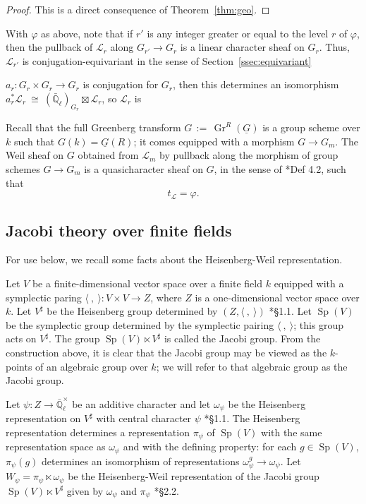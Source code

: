 \documentclass[10pt]{amsart}
\theoremstyle{plain}
\theoremstyle{definition}
\newcommand{\EE}{\mathbb{\bar Q}_\ell}
\newcommand{\Fq}{k}
\newcommand{\EEx}{\EE^\times}
\DeclareMathOperator{\Gr}{Gr}
\newcommand{\ceq}{{\, :=\, }}
\newcommand{\iso}{{\ \cong\ }}
\newcommand{\trFrob}[1]{t_{#1}}
\newcommand{\cs}[1]{{\mathcal{#1}}}
\newcommand{\Sp}{{\operatorname{Sp}}}
\begin{document}
\begin{proof}
This is a direct consequence of Theorem~\ref{thm:geo}.
\end{proof}

With $\varphi$ as above, note that if $r'$ is any integer greater or equal to the level $r$ of $\varphi$, then the pullback of $\cs{L}_r$ along $G_{r'} \to G_{r}$ is a linear character sheaf on $G_r$. 
Thus, $\cs{L}_{r'}$ is conjugation-equivariant in the sense of Section~\ref{ssec:equivariant}


$a_r : G_r\times G_r \to G_r$ is conjugation for $G_r$, then this determines an isomorphism $a_r^*\cs{L}_r \iso (\EE)_{G_r}\boxtimes \cs{L}_r$, so $\cs{L}_r$ is 


Recall that the full Greenberg transform $G \ceq \Gr^{R}(\underline{G})$ is a group scheme over $\Fq$ such that $G(\Fq) = \underline{G}(R)$; it comes equipped with a morphism $G \to G_m$.
The Weil sheaf on $G$ obtained from $\cs{L}_m$ by pullback along the morphism of group schemes $G \to G_m$ is a quasicharacter sheaf on $G$, in the sense of \cite{cunningham-roe:13a}*{Def 4.2}, such that 
\[
\trFrob{\cs{L}} = \varphi.
\]



\subsection{Jacobi theory over finite fields}\label{ssec:Jacobi}

For use below, we recall some facts about the Heisenberg-Weil representation.

Let $V$ be a finite-dimensional vector space over a finite field $\Fq$ equipped with a symplectic paring $\langle\ ,\ \rangle : V\times V \to Z$, where $Z$ is a one-dimensional vector space over $\Fq$.
Let $V^\sharp$ be the Heisenberg group determined by $(Z, \langle\ ,\ \rangle)$ \cite{gurevich-hadani:07a}*{\S 1.1}.
Let $\Sp(V)$ be the symplectic group determined by the symplectic pairing $\langle\ ,\ \rangle$; this group acts on $V^\sharp$.
The group $\Sp(V)\ltimes V^\sharp$ is called the Jacobi group. 
From the construction above, it is clear that the Jacobi group may be viewed as the $\Fq$-points of an algebraic group over $\Fq$; we will refer to that algebraic group as the Jacobi group.

Let $\psi : Z \to \EEx$ be an additive character and let $\omega_\psi$ be the Heisenberg representation on $V^\sharp$ with central character $\psi$ \cite{gurevich-hadani:07a}*{\S 1.1}. 
The Heisenberg representation determines a representation $\pi_{\psi}$ of $\Sp(V)$ with the same representation space as $\omega_\psi$ and with the defining property: for each $g\in \Sp(V)$, $\pi_\psi(g)$ determines an isomorphism of representations $\omega_\psi^g \to \omega_\psi$.
Let $W_\psi = \pi_\psi \ltimes \omega_\psi$ be the Heisenberg-Weil representation of the Jacobi group $\Sp(V)\ltimes V^\sharp$ given by $\omega_\psi$ and $\pi_\psi$ \cite{gurevich-hadani:07a}*{\S 2.2}.
\end{document}
